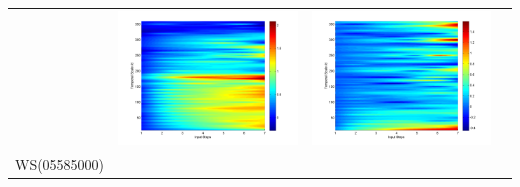 \documentclass[11pt]{article}
\begin{document}
\begin{table}[H]
{\begin{tabular}{cccc}
&\begin{minipage}{.3\textwidth}\includegraphics[width=\linewidth]{resultgraph/02143000diff_ep.png}\end{minipage}
&\begin{minipage}{.3\textwidth}\includegraphics[width=\linewidth]{resultgraph/02143000diff_q.png}\end{minipage}
\\
WS(05585000)

\end{tabular}}
\end{table}
\end{document}
